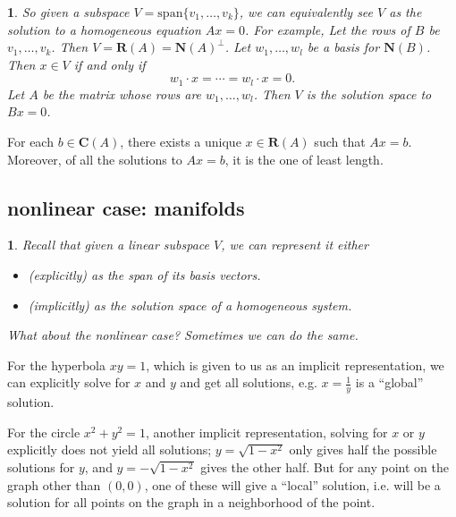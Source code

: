 \documentclass[12pt]{article}
\newtheorem{para}[theorem]{}
\begin{document}
\begin{para} 
	So given a subspace $V=\text{span}\{v_1,\dots,v_k\}$, we can equivalently see $V$ as the solution to a homogeneous equation $Ax=0$. For example, Let the rows of $B$ be $v_1,\dots,v_k$. Then $V=\mathbf{R}(A)=\mathbf{N}(A)^\perp$. Let $w_1,\dots,w_l$ be a basis for $\mathbf{N}(B)$. Then $x\in V$ if and only if 
	\begin{equation*}
		w_1\cdot x = \cdots = w_l\cdot x = 0.
	\end{equation*}
	Let $A$ be the matrix whose rows are $w_1,\dots, w_l$. Then $V$ is the solution space to $Bx=0$.
\end{para}	

\begin{proposition}
	For each $b\in\mathbf{C}(A)$, there exists a unique $x\in\mathbf{R}(A)$ such that $Ax=b$. Moreover, of all the solutions to $Ax=b$, it is the one of least length.
\end{proposition}


\subsection{nonlinear case: manifolds} %

\begin{para} 
	Recall that given a linear subspace $V$, we can represent it either
	\begin{itemize}
		\item (explicitly) as the span of its basis vectors.
		\item (implicitly) as the solution space of a homogeneous system.
	\end{itemize}
	What about the nonlinear case? Sometimes we can do the same.
\end{para}	

\begin{example}
	For the hyperbola $xy=1$, which is given to us as an implicit representation, we can explicitly solve for $x$ and $y$ and get all solutions, e.g. $x=\frac{1}{y}$ is a ``global'' solution.
\end{example}

\begin{example}
	For the circle $x^2+y^2=1$, another implicit representation, solving for $x$ or $y$ explicitly does not yield all solutions; $y=\sqrt{1-x^2}$ only gives half the possible solutions for $y$, and $y=-\sqrt{1-x^2}$ gives the other half. But for any point on the graph other than $(0,0)$, one of these will give a ``local'' solution, i.e. will be a solution for all points on the graph in a neighborhood of the point.
\end{example}
\end{document}
